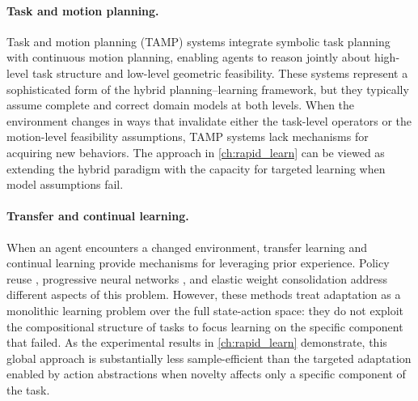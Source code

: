 \paragraph{Task and motion planning.}
Task and motion planning (TAMP) systems \citep{garrett2021integrated, kaelbling2011hierarchical} integrate symbolic task planning with continuous motion planning, enabling agents to reason jointly about high-level task structure and low-level geometric feasibility. These systems represent a sophisticated form of the hybrid planning--learning framework, but they typically assume complete and correct domain models at both levels. When the environment changes in ways that invalidate either the task-level operators or the motion-level feasibility assumptions, TAMP systems lack mechanisms for acquiring new behaviors. The approach in \cref{ch:rapid_learn} can be viewed as extending the hybrid paradigm with the capacity for targeted learning when model assumptions fail.

\paragraph{Transfer and continual learning.}
When an agent encounters a changed environment, transfer learning and continual learning provide mechanisms for leveraging prior experience. Policy reuse \citep{glatt2017policy}, progressive neural networks \citep{rusu2016progressive}, and elastic weight consolidation \citep{kirkpatrick2017overcoming} address different aspects of this problem. However, these methods treat adaptation as a monolithic learning problem over the full state-action space: they do not exploit the compositional structure of tasks to focus learning on the specific component that failed. As the experimental results in \cref{ch:rapid_learn} demonstrate, this global approach is substantially less sample-efficient than the targeted adaptation enabled by action abstractions when novelty affects only a specific component of the task.

